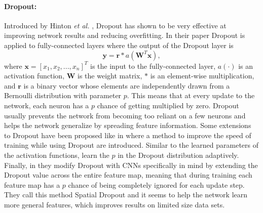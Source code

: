 \paragraph{Dropout:}
Introduced by Hinton \textit{et al.} \cite{hinton2012improving}, Dropout has shown to be very effective at improving network results and reducing overfitting. In their paper Dropout is applied to fully-connected layers where the output of the Dropout layer is 
\begin{equation}
\textbf{y} = \textbf{r} \ast a(\textbf{W}^T\textbf{x}), 
\label{eq:dropout}
\end{equation}
where $\textbf{x} = [x_1,x_2,...,x_n]^T$ is the input to the fully-connected layer, $a(\cdot)$ is an activation function, $\textbf{W}$ is the weight matrix, $\ast$ is an element-wise multiplication, and $\textbf{r}$ is a binary vector whose elements are independently drawn from a Bernoulli distribution with parameter $p$. This means that at every update to the network, each neuron has a $p$ chance of getting multiplied by zero. Dropout usually prevents the network from becoming too reliant on a few neurons and helps the network generalize by spreading feature information. Some extensions to Dropout have been proposed like in \cite{wang2013fast} where a method to improve the speed of training while using Dropout are introduced. Similar to the learned parameters of the activation functions, \cite{ba2013adaptive} learn the $p$ in the Dropout distribution adaptively. Finally, in \cite{tompson2015efficient} they modify Dropout with CNNs specifically in mind by extending the Dropout value across the entire feature map, meaning that during training each feature map has a $p$ chance of being completely ignored for each update step. They call this method Spatial Dropout and it seems to help the network learn more general features, which improves results on limited size data sets.

